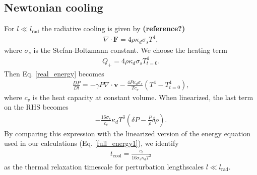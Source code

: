 \subsection{Newtonian cooling}\label{newton_cool}
For $l\ll l_\mathrm{rad}$ the radiative cooling is given by {\bf (reference?)}
\begin{align}
\nabla\cdot\bm{F} = 4 \rho \kappa_d \sigma_s T^4,
\end{align}   
where $\sigma_s$ is the Stefan-Boltzmann constant. We choose the
heating term 
\begin{align}
  Q_+ = 4\rho\kappa_d\sigma_s T^{4}_{t=0}. 
\end{align}
Then Eq. \ref{real_energy} becomes
\begin{align}
  \frac{DP}{Dt} = -\gamma P \nabla\cdot\bm{v} -
  \frac{4P\kappa_d\sigma_s}{Tc_v}\left(T^4 - T_{t=0}^4\right), 
\end{align}
where $c_v$ is the heat capacity at constant volume. When linearized, the last term on the RHS becomes
\begin{align}
  -\frac{16\sigma_s}{c_v}\kappa_d T^3\left(\delta P -
    \frac{P}{\rho}\delta\rho\right). 
\end{align}
By comparing this expression with the linearized version of the energy
equation used in our calculations (Eq. \ref{full_energy1}), we identify 
\begin{align}\label{tc_newton_cool} 
  t_\mathrm{cool} = \frac{c_v}{16\sigma_s\kappa_dT^3}
\end{align}
as the thermal relaxation timescale for perturbation lengthscales
$l\ll l_\mathrm{rad}$. 

